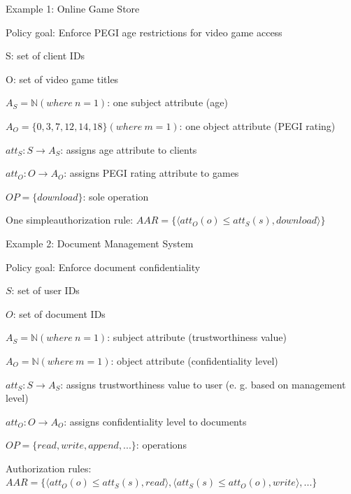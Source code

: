\documentclass[a4paper]{article}
\begin{document}
\begin{multicols}{3}
    Example 1: Online Game Store
    \begin{itemize*}
        \item Policy goal: Enforce PEGI age restrictions for video game access
        \item S: set of client IDs
        \item O: set of video game titles
        \item $A_S=\mathbb{N}(where\ n=1)$: one subject attribute (age)
        \item $A_O=\{0,3,7,12,14,18\}(where\ m=1)$: one object attribute (PEGI rating)
        \item $att_S:S\rightarrow A_S$: assigns age attribute to clients
        \item $att_O:O\rightarrow A_O$: assigns PEGI rating attribute to games
        \item $OP=\{download\}$: sole operation
        \item One simpleauthorization rule: $AAR=\{⟨att_O(o) \leq att_S(s),download⟩\}$
    \end{itemize*}

    Example 2: Document Management System
    \begin{itemize*}
        \item Policy goal: Enforce document confidentiality
        \item $S$: set of user IDs
        \item $O$: set of document IDs
        \item $A_S=\mathbb{N}(where\ n=1)$: subject attribute (trustworthiness value)
        \item $A_O=\mathbb{N}(where\ m=1)$: object attribute (confidentiality level)
        \item $att_S:S\rightarrow A_S$: assigns trustworthiness value to user (e. g. based on management level)
        \item $att_O:O\rightarrow A_O$: assigns confidentiality level to documents
        \item $OP=\{read,write,append,...\}$: operations
        \item Authorization rules: $AAR=\{⟨att_O(o)\leq att_S(s),read⟩,⟨att_S(s) \leq att_O(o),write⟩,...\}$
    \end{itemize*}


\end{multicols}
\end{document}
